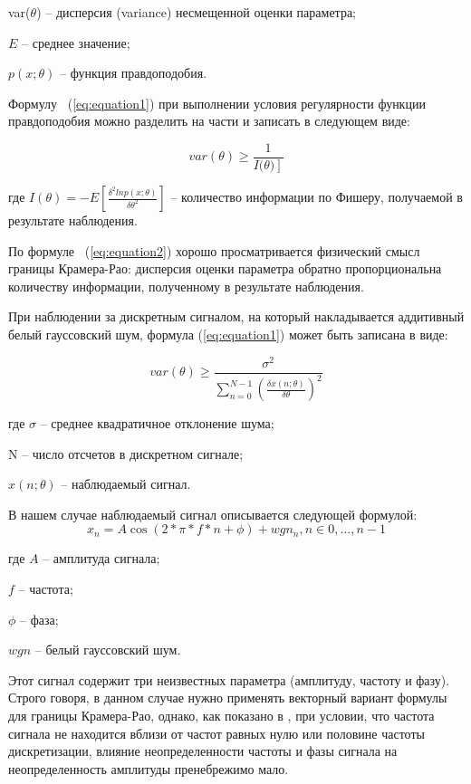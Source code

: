 var($\theta$) -- дисперсия (variance) несмещенной оценки параметра;

$E$ -- среднее значение;

$p(x;\theta)$ -- функция правдоподобия.

Формулу ~(\ref{eq:equation1}) при выполнении условия регулярности функции правдоподобия можно разделить на части и записать в следующем виде:

\begin{equation}
	\label{eq:equation2}
	var(\theta)\geq\frac{1}{I(\left.\theta)\right]}
\end{equation}

где $I(\theta)=-E\left[\frac{\delta^2 ln p(x;\theta)}{\delta\theta^2}\right]$ -- количество информации по Фишеру, получаемой в результате наблюдения.

По формуле ~(\ref{eq:equation2}) хорошо просматривается физический смысл границы Крамера-Рао: дисперсия оценки параметра обратно пропорциональна количеству информации, полученному в результате наблюдения.

При наблюдении за дискретным сигналом, на который накладывается аддитивный белый гауссовский шум, формула (\ref{eq:equation1}) может быть записана в виде: 

\begin{equation}
	\label{eq:equation3}
	var(\theta)\geq\frac{\sigma^2}{\sum_{n=0}^{N-1}\left(\frac{\delta x(n;\theta)}{\delta\theta}\right)^2}
\end{equation}

где $\sigma $ -- среднее квадратичное отклонение шума;

N -- число отсчетов в дискретном сигнале;

$x(n;\theta)$ -- наблюдаемый сигнал.

В нашем случае наблюдаемый сигнал описывается следующей формулой:
\begin{equation}
	\label{eq:equation4}
	x_n=A\cos(2*\pi*f*n+\phi)+wgn_n, n\in0,…,n-1
\end{equation}

где $A$ -- амплитуда сигнала;

$f$ -- частота;

$\phi$ -- фаза;

$wgn$ -- белый гауссовский шум.

Этот сигнал содержит три неизвестных параметра (амплитуду, частоту и фазу). Строго говоря, в данном случае нужно применять векторный вариант формулы для границы Крамера-Рао, однако, как показано в \cite{kay1993fundamentals}, при условии, что частота сигнала не находится вблизи от частот равных нулю или половине частоты дискретизации, влияние неопределенности частоты и фазы сигнала на неопределенность амплитуды пренебрежимо мало.

